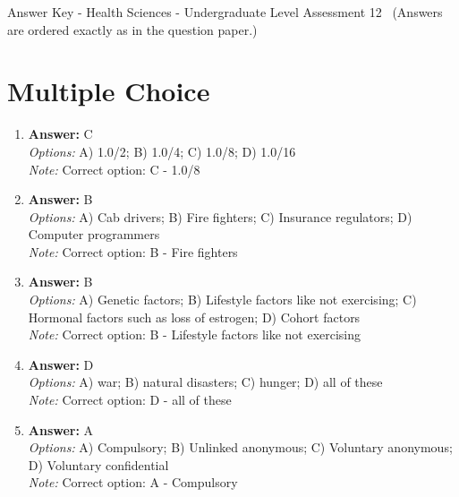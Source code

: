 \documentclass[12pt]{article}
\begin{document}
\begin{center}
Answer Key - Health Sciences - Undergraduate Level Assessment 12 \
\small (Answers are ordered exactly as in the question paper.)
\end{center}

\section*{Multiple Choice}
\begin{enumerate}[label=\arabic*.]
\item \textbf{Answer:} C
\\ \textit{Options:} A) 1.0/2; B) 1.0/4; C) 1.0/8; D) 1.0/16
\\ \textit{Note:} Correct option: C - 1.0/8
\item \textbf{Answer:} B
\\ \textit{Options:} A) Cab drivers; B) Fire fighters; C) Insurance regulators; D) Computer programmers
\\ \textit{Note:} Correct option: B - Fire fighters
\item \textbf{Answer:} B
\\ \textit{Options:} A) Genetic factors; B) Lifestyle factors like not exercising; C) Hormonal factors such as loss of estrogen; D) Cohort factors
\\ \textit{Note:} Correct option: B - Lifestyle factors like not exercising
\item \textbf{Answer:} D
\\ \textit{Options:} A) war; B) natural disasters; C) hunger; D) all of these
\\ \textit{Note:} Correct option: D - all of these
\item \textbf{Answer:} A
\\ \textit{Options:} A) Compulsory; B) Unlinked anonymous; C) Voluntary anonymous; D) Voluntary confidential
\\ \textit{Note:} Correct option: A - Compulsory
\end{enumerate}
\end{document}
